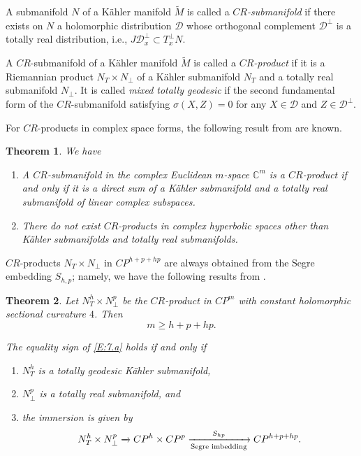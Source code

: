 \documentclass{amsart}
\theoremstyle{plain}
\newtheorem{theorem}{Theorem}[section]
\numberwithin{equation}{section}
\theoremstyle{remark}
\numberwithin{equation}{section}
\begin{document}
A submanifold $N$ of a K\"ahler manifold $\tilde M$ is called a {\it $CR$-submanifold} \cite{bejancu} if there exists on $N$ a holomorphic distribution $\mathcal D$ whose orthogonal  complement $\mathcal D^\perp$ is a totally real distribution, i.e., $J\mathcal D^\perp_x\subset T^\perp_x N$. 

A $CR$-submanifold  of a K\"ahler manifold $\tilde M$ is called a
{\it $CR$-product} \cite{c2} if it is a Riemannian product  $N_T\times N_\perp$ of a K\"ahler submanifold $N_T$ and a totally real submanifold $N_\perp$.  It is called {\it mixed totally geodesic} if the second fundamental form of the $CR$-submanifold satisfying $\sigma(X,Z)=0$ for any $X\in \mathcal D$ and $Z\in \mathcal D^{\perp}$.

For $CR$-products in complex space forms, the following result from \cite{c2} are known. 

\begin{theorem}\label{T:7.1} We have
\begin{enumerate}
\item[(i)] A $CR$-submanifold in the complex Euclidean $m$-space $\mathbb C^m$  is a $CR$-product if and only if it is a direct sum of a K\"ahler submanifold and a totally real submanifold of  linear complex subspaces. 

\item[(ii)] There do not exist $CR$-products in complex hyperbolic spaces other than K\"ahler submanifolds and totally real submanifolds.
\end{enumerate}\end{theorem}

 $CR$-products $N_T\times N_\perp$ in $CP^{h+p+hp}$ are always obtained from the Segre embedding $S_{h,p}$; namely, we have the following results from \cite{c2}.

\begin{theorem}\label{T:7.2}  Let $N_T^{h}\times N_\perp^p$ be the $CR$-product in $CP^m$ with constant holomorphic sectional curvature $4$. Then 
\begin{equation}\label{E:7.a} m\geq h+p+ hp. \end{equation}
 
The equality sign of \eqref{E:7.a} holds if and only if 

\begin{enumerate}
\item[(a)] $N_T^h$ is a totally geodesic K\"ahler submanifold, 

\item[(b)] $N_\perp^p$ is a totally real submanifold, and 

\item[(c)] the immersion is given by
\begin{equation}\notag N_T^h\times N_\perp^p \xrightarrow{\text{{\rm}}} CP^h\times CP^p\xrightarrow [\text{{\rm Segre imbedding}}]{\text{$S_{hp}$}} CP^{h+p+hp}.\end{equation} 
\end{enumerate}\end{theorem}  
\end{document}
